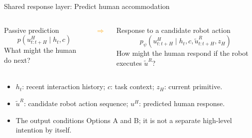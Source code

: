 \documentclass[aspectratio=169,11pt]{beamer}
\begin{document}
\begin{frame}{Shared response layer: Predict human accommodation}
\begin{columns}[c,onlytextwidth]
\begin{block}{Passive prediction}
\[
p(u^H_{t:t+H}\mid h_t,c)
\]
\centering What might the human do next?
\end{block}
\centering\Large\textcolor{orange}{$\Longrightarrow$}
\begin{alertblock}{Response to a candidate robot action}
\[
p_\psi(u^H_{t:t+H}\mid h_t,c,\tilde u^R_{t:t+H},z_H)
\]
\centering How might the human respond if the robot executes $\tilde u^R$?
\end{alertblock}
\end{columns}
\vspace{0.25cm}
\begin{itemize}
  \item $h_t$: recent interaction history; $c$: task context; $z_H$: current primitive.
  \item $\tilde u^R$: candidate robot action sequence; $u^H$: predicted human response.
  \item The output conditions Options A and B; it is not a separate high-level intention by itself.
\end{itemize}
\end{frame}
\end{document}
